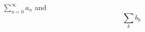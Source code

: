 \documentclass{article}
\begin{document}
$\sum_{n=0}^{\infty} a_n$ and \[ \sum_{k} b_k \]
\end{document}
